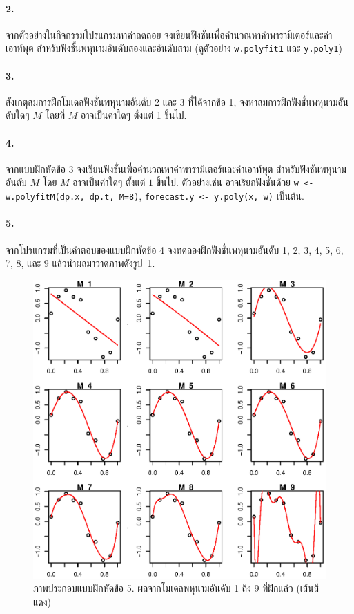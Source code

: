 \paragraph{2.} จากตัวอย่างในกิจกรรมโปรแกรมหาค่าถดถอย 
จงเขียนฟังชั่นเพื่อคำนวณหาค่าพารามิเตอร์และค่าเอาท์พุต สำหรับฟังชั้นพหุนามอันดับสองและอันดับสาม (ดูตัวอย่าง \texttt{w.polyfit1} และ \texttt{y.poly1})

\paragraph{3.} สังเกตุสมการฝึกโมเดลฟังชั่นพหุนามอันดับ 2 และ 3 ที่ได้จากข้อ 1, จงหาสมการฝึกฟังชั้นพหุนามอันดับใดๆ $M$ โดยที่ $M$ อาจเป็นค่าใดๆ ตั้งแต่ 1 ขึ้นไป. 

\paragraph{4.} จากแบบฝึกหัดข้อ 3 
จงเขียนฟังชั่นเพื่อคำนวณหาค่าพารามิเตอร์และค่าเอาท์พุต สำหรับฟังชั่นพหุนามอันดับ $M$ โดย $M$ อาจเป็นค่าใดๆ ตั้งแต่ $1$ ขึ้นไป. 
ตัวอย่างเช่น อาจเรียกฟังชั่นด้วย \texttt{w <- w.polyfitM(dp.x, dp.t, M=8)}, \texttt{forecast.y <- y.poly(x, w)} เป็นต้น. 

\paragraph{5.} จากโปรแกรมที่เป็นคำตอบของแบบฝึกหัดข้อ 4
จงทดลองฝึกฟังชั่นพหุนามอันดับ 1, 2, 3, 4, 5, 6, 7, 8, และ 9 แล้วนำผลมาวาดภาพดังรูป~\ref{fig: bg ex 5}.

%
\begin{figure}
\begin{center}
\includegraphics[width=5.5in]{02Background/bgEx01.eps}
\end{center}
\caption{ภาพประกอบแบบฝึกหัดข้อ 5.
ผลจากโมเดลพหุนามอันดับ 1 ถึง 9 ที่ฝึกแล้ว (เส้นสีแดง)}
\label{fig: bg ex 5}
\end{figure}
%

